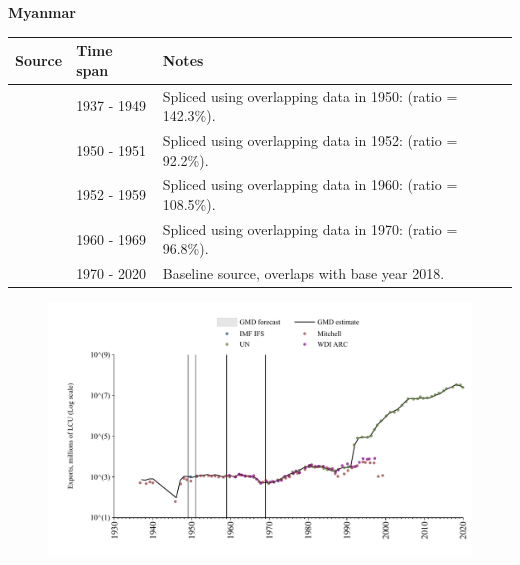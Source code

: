 \documentclass[12pt,a4paper,landscape]{article}
\begin{document}
\begin{adjustbox}{max totalsize={\paperwidth}{\paperheight},center}
\begin{minipage}[t][\textheight][t]{\textwidth}
\vspace*{0.5cm}
{}
\begin{center}
{\Large\bfseries Myanmar}
\end{center}
\vspace{0.5cm}
\begin{table}[H]
\centering
\small
\begin{tabular}{|l|l|l|}
\hline
\textbf{Source} & \textbf{Time span} & \textbf{Notes} \\
\hline
\rowcolor{white}\cite{Mitchell}& 1937 - 1949 &Spliced using overlapping data in 1950: (ratio = 142.3\%).\\
\rowcolor{lightgray}\cite{IMF_IFS}& 1950 - 1951 &Spliced using overlapping data in 1952: (ratio = 92.2\%).\\
\rowcolor{white}\cite{Mitchell}& 1952 - 1959 &Spliced using overlapping data in 1960: (ratio = 108.5\%).\\
\rowcolor{lightgray}\cite{WDI_ARC}& 1960 - 1969 &Spliced using overlapping data in 1970: (ratio = 96.8\%).\\
\rowcolor{white}\cite{UN}& 1970 - 2020 &Baseline source, overlaps with base year 2018.\\
\hline
\end{tabular}
\end{table}
\begin{figure}[H]
\centering
\includegraphics[width=\textwidth,height=0.6\textheight,keepaspectratio]{graphs/MMR_exports.pdf}
\end{figure}
\end{minipage}
\end{adjustbox}
\end{document}

